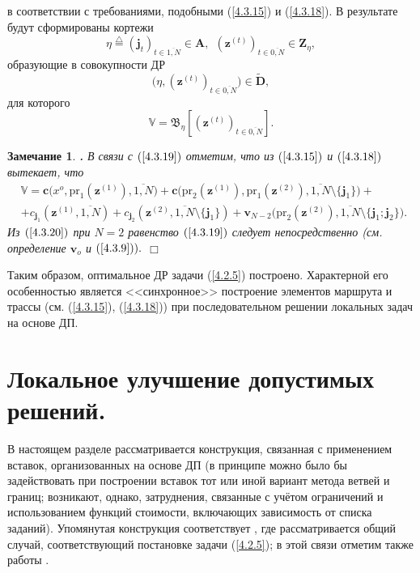 \documentclass[12pt,twoside]{report}
\newcommand{\bfn}{\begin{equation}}
\newcommand{\efn}{\end{equation}}
\newcommand{\df}{\stackrel{\triangle}{=}}
\newcommand{\ov}{\overline}
\newcounter{theo}
\newcounter{zam}
\newtheorem{zam}{Замечание}[section]
\newcommand{\TL}{\mbox{\bf{$\!\!$.}}}
\newcommand{\sm}{\setminus}
\begin{document}
{в соответствии с требованиями, подобными (\ref{4.3.15}) и (\ref{4.3.18}). В результате будут
сформированы кортежи
$$\eta\df (\mathbf{j}_t)_{t\in\ov{1,N}}\in \mathbf{A},\ \ (\mathbf{z}^{(t)})_{t\in \ov{0,N}}\in \mathbf{Z}_\eta,
$$
образующие в совокупности ДР
$$\bigl(\eta, (\mathbf{z}^{(t)})_{t\in \ov{0,N}}\bigl)\in \widetilde{\mathbf{D}},
$$
для которого
\bfn\label{4.3.19} \mathbb{V}= \mathfrak{B}_\eta[(\mathbf{z}^{(t)})_{t\in \ov{0,N}}].
\efn
\begin{zam}\label{z4.3.1}{\TL}
 В связи с $(\ref{4.3.19})$ отметим, что из $(\ref{4.3.15})$ и $(\ref{4.3.18})$ вытекает, что
\begin{eqnarray}
& \mathbb{V}=\mathbf{c}\bigl(x^o,\mathrm{pr}_1(\mathbf{z}^{(1)}),\ov{1,N}\bigl) +
\mathbf{c}\bigl(\mathrm{pr}_2(\mathbf{z}^{(1)}), \mathrm{pr}_1(\mathbf{z}^{(2)}),\ov{1,N}\sm
\{\mathbf{j}_1\}) +
&\nonumber\\
&+  c_{\mathbf{j}_1}(\mathbf{z}^{(1)},\ov{1,N}) +
c_{\mathbf{j}_2}(\mathbf{z}^{(2)},
\ov{1,N}\sm\{\mathbf{j}_1 \}) +
\mathbf{v}_{N-2}\bigl(\mathrm{pr}_2(\mathbf{z}^{(2)}),\ov{1,N}\sm\{\mathbf{j}_1;\mathbf{j}_2\}\bigl).
&\label{4.3.20}
\end{eqnarray}
 Из $(\ref{4.3.20})$ при $N=2$ равенство $(\ref{4.3.19})$ следует непосредственно (см.
определение $\mathbf{v}_o$ и $(\ref{4.3.9})).$
 \hfill $\Box$
 \end{zam}

Таким образом, оптимальное ДР задачи (\ref{4.2.5}) построено. Характерной его особенностью является
<<синхронное>> построение элементов маршрута и трассы (см. (\ref{4.3.15}), (\ref{4.3.18})) при
последовательном решении локальных задач на основе ДП.


\section{Локальное улучшение допустимых решений.}
\setcounter{equation}{0}

В настоящем разделе рассматривается конструкция, связанная с применением вставок,
организованных на основе ДП (в принципе можно было бы задействовать при построении
вставок тот или иной вариант метода ветвей и границ; возникают, однако, затруднения,
связанные с учётом ограничений и использованием функций стоимости, включающих
зависимость от списка заданий). Упомянутая конструкция соответствует  \cite{Cha13`},
где рассматривается общий случай, соответствующий постановке задачи (\ref{4.2.5});
в этой связи отметим также работы   \cite{Cha14`,Cha15`}.

}
\end{document}
